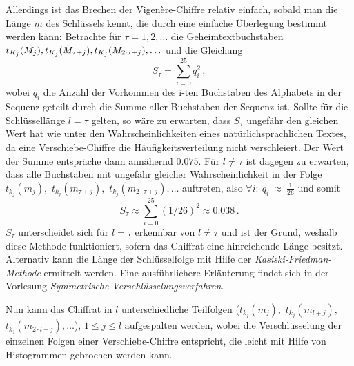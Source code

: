 Allerdings ist das Brechen der Vigenère-Chiffre relativ einfach, sobald
man die Länge $m$ des Schlüssels kennt, die durch eine einfache
Überlegung bestimmt werden kann: Betrachte für $\tau = 1,2,\ldots$ die
Geheimtextbuchstaben
$t_{K_j}(M_j),t_{K_j}(M_{\tau+j}),t_{K_j}(M_{2
  \cdot \tau+j}),\ldots$ und die Gleichung 
\begin{equation*}
	S_{\tau}=	\sum_{i=0}^{25} q^2_i \, ,
\end{equation*}
wobei $q_i$ die Anzahl der Vorkommen des i-ten Buchstaben des Alphabets
in der Sequenz geteilt durch die Summe aller Buchstaben der Sequenz
ist. Sollte für die Schlüssellänge $l = \tau$ gelten, so wäre zu
erwarten, dass $S_{\tau}$ ungefähr den gleichen Wert hat wie unter den
Wahrscheinlichkeiten eines natürlichsprachlichen Textes, da eine
Verschiebe-Chiffre die Häufigkeitsverteilung nicht verschleiert. Der
Wert der Summe entspräche dann annähernd $0.075$.  Für $l \neq \tau$ ist
dagegen zu erwarten, dass alle Buchstaben mit ungefähr gleicher
Wahrscheinlichkeit in der Folge $t_{k_j}(m_j),$ $t_{k_j}(m_{\tau+j}),$
$t_{k_j}(m_{2 \cdot \tau+j}),\ldots$ auftreten, also $\forall
i\colon~q_i~\approx~\frac{1}{26}$ und somit
\begin{equation*}
  S_{\tau} \approx \sum_{i=0}^{25} (1/26)^2 \approx 0.038 \,\text{.}
\end{equation*}
$S_{\tau}$ unterscheidet sich für $l = \tau$ erkennbar von $l \neq \tau$
und ist der Grund, weshalb diese Methode funktioniert, sofern das
Chiffrat eine hinreichende Länge besitzt. Alternativ kann die Länge der
Schlüsselfolge mit Hilfe der \emph{Kasiski-Friedman-Methode}
\cite{Kasiski1863} ermittelt werden. Eine ausführlichere Erläuterung
findet sich in der Vorlesung \emph{Symmetrische
  Verschlüsselungsverfahren}\cite{Geiselmann2016}. 

Nun kann das Chiffrat in $l$ unterschiedliche Teilfolgen
($t_{k_j}(m_j),$ $t_{k_j}(m_{l+j}),$ $t_{k_j}(m_{2 \cdot l+j}),\ldots$),
$1 \leq j \leq l$ aufgespalten werden, wobei die Verschlüsselung der
einzelnen Folgen einer Verschiebe-Chiffre entspricht, die leicht mit
Hilfe von Histogrammen gebrochen werden kann. 

